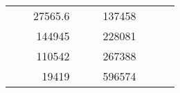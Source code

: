 \begin{table}[]
\begin{tabular}{|ccrccrccc}
\multicolumn{1}{|c|}{\cellcolor[HTML]{FFFFC7}}                                & \multicolumn{1}{c|}{\cellcolor[HTML]{DDFDFF}}                      & \multicolumn{1}{r|}{\cellcolor[HTML]{DAE8FC}27565.6}   & \multicolumn{1}{c|}{\cellcolor[HTML]{FFFFC7}}                                & \multicolumn{1}{c|}{\cellcolor[HTML]{DDFDFF}}                       & \multicolumn{1}{r|}{\cellcolor[HTML]{DDFDFF}137458}    &                                                                              &                                                                    &                                                        \\ \cline{3-3} \cline{6-6}
\multicolumn{1}{|c|}{\cellcolor[HTML]{FFFFC7}}                                & \multicolumn{1}{c|}{\cellcolor[HTML]{DDFDFF}}                      & \multicolumn{1}{r|}{\cellcolor[HTML]{DDFDFF}144945}    & \multicolumn{1}{c|}{\cellcolor[HTML]{FFFFC7}}                                & \multicolumn{1}{c|}{\cellcolor[HTML]{DDFDFF}}                       & \multicolumn{1}{r|}{\cellcolor[HTML]{DAE8FC}228081}    &                                                                              &                                                                    &                                                        \\ \cline{3-3} \cline{6-6}
\multicolumn{1}{|c|}{\cellcolor[HTML]{FFFFC7}}                                & \multicolumn{1}{c|}{\cellcolor[HTML]{DDFDFF}}                      & \multicolumn{1}{r|}{\cellcolor[HTML]{DAE8FC}110542}    & \multicolumn{1}{c|}{\cellcolor[HTML]{FFFFC7}}                                & \multicolumn{1}{c|}{\cellcolor[HTML]{DDFDFF}}                       & \multicolumn{1}{r|}{\cellcolor[HTML]{DDFDFF}267388}    &                                                                              &                                                                    &                                                        \\ \cline{3-3} \cline{6-6}
\multicolumn{1}{|c|}{\cellcolor[HTML]{FFFFC7}}                                & \multicolumn{1}{c|}{\cellcolor[HTML]{DDFDFF}}                      & \multicolumn{1}{r|}{\cellcolor[HTML]{DDFDFF}19419}     & \multicolumn{1}{c|}{\cellcolor[HTML]{FFFFC7}}                                & \multicolumn{1}{c|}{\cellcolor[HTML]{DDFDFF}}                       & \multicolumn{1}{r|}{\cellcolor[HTML]{DAE8FC}596574}    &                                                                              &                                                                    &                                                        \\ \cline{3-3} \cline{6-6}

\end{tabular}
\end{table}
